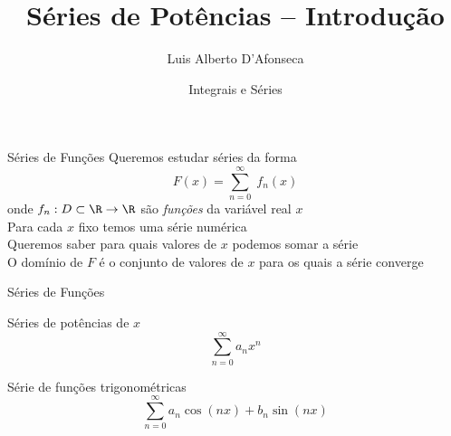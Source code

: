
\usepackage{apresentacao}
\usepackage{mathconfig}
\usepackage{tabto}

\makeatletter
\graphicspath  {{./figs/}}
\makeatother

\setcounter{exemplo}{0}

\title {Séries de Potências -- Introdução}
\author{\large Luis Alberto D'Afonseca}
\date  {Integrais e Séries}



\begin{frame}
    \titlepage
\end{frame}

\begin{frame}{Séries de Funções}
  Queremos estudar séries da forma
  \[
    F(x) = \sum_{n=0}^\infty\; f_n(x)
  \]
  \pause
  onde $f_n:D \subset \R\to\R$ são \emph{funções} da variável real $x$ \\[5mm]

  \pause
  Para cada $x$ fixo temos uma série numérica \\[5mm]

  \pause
  Queremos saber para quais valores de $x$ podemos somar a série \\[5mm]

  \pause
  O domínio de $F$ é o conjunto de valores de $x$ para os quais a série converge
\end{frame}

\begin{frame}{Séries de Funções}
  \begin{description}[<+->]
    \item[Séries de Potências] Séries de potências de $x$
    \[
      \sum_{n=0}^\infty a_n x^n
    \]

    \item[Séries de Fourier] Série de funções trigonométricas
    \[
      \sum_{n=0}^\infty a_n \cos(nx) + b_n \sin(nx)
    \]
  \end{description}
\end{frame}

